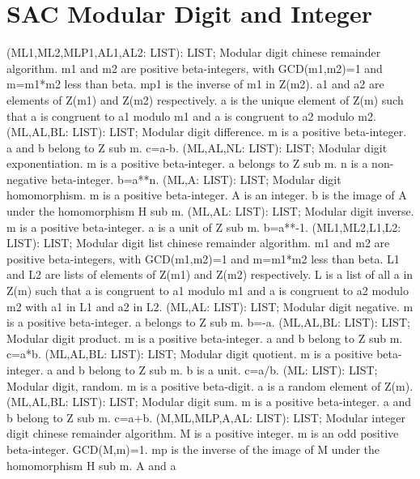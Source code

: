 \section{ SAC Modular Digit and Integer  } 
 (ML1,ML2,MLP1,AL1,AL2: LIST): LIST; \eproc
\bcom Modular digit chinese remainder algorithm. m1 and m2 are positive
beta-integers, with GCD(m1,m2)=1 and m=m1*m2 less than beta.
mp1 is the inverse of m1 in Z(m2).  a1 and a2 are elements of
Z(m1) and Z(m2) respectively.  a is the unique element of Z(m) such
that a is congruent to a1 modulo m1 and a is congruent to a2
modulo m2. \ecom 
{} (ML,AL,BL: LIST): LIST; \eproc
\bcom Modular digit difference. m is a positive beta-integer. a and b
belong to Z sub m. c=a-b. \ecom 
{} (ML,AL,NL: LIST): LIST; \eproc
\bcom Modular digit exponentiation. m is a positive beta-integer.
a belongs to Z sub m. n is a non-negative beta-integer. b=a**n. \ecom 
{} (ML,A: LIST): LIST; \eproc
\bcom Modular digit homomorphism. m is a positive beta-integer. A is an
integer. b is the image of A under the homomorphism H sub m. \ecom 
{} (ML,AL: LIST): LIST; \eproc
\bcom Modular digit inverse. m is a positive beta-integer. a is a unit
of Z sub m. b=a**-1. \ecom 
{} (ML1,ML2,L1,L2: LIST): LIST; \eproc
\bcom Modular digit list chinese remainder algorithm. m1 and m2 are
positive beta-integers, with GCD(m1,m2)=1 and m=m1*m2 less than
beta.  L1 and L2 are lists of elements of Z(m1) and Z(m2)
respectively.  L is a list of all a in Z(m) such that a is congruent
to a1 modulo m1 and a is congruent to a2 modulo m2 with a1 in L1
and a2 in L2. \ecom 
{} (ML,AL: LIST): LIST; \eproc
\bcom Modular digit negative. m is a positive beta-integer. a belongs
to Z sub m. b=-a. \ecom 
{} (ML,AL,BL: LIST): LIST; \eproc
\bcom Modular digit product. m is a positive beta-integer. a and b
belong to Z sub m. c=a*b. \ecom 
{} (ML,AL,BL: LIST): LIST; \eproc
\bcom Modular digit quotient. m is a positive beta-integer. a and b
belong to Z sub m. b is a unit. c=a/b. \ecom 
{} (ML: LIST): LIST; \eproc
\bcom Modular digit, random. m is a positive beta-digit. a is a random
element of Z(m). \ecom 
{} (ML,AL,BL: LIST): LIST; \eproc
\bcom Modular digit sum. m is a positive beta-integer. a and b belong
to Z sub m. c=a+b. \ecom 
{} (M,ML,MLP,A,AL: LIST): LIST; \eproc
\bcom Modular integer digit chinese remainder algorithm. M is a positive
integer.  m is an odd positive beta-integer.  GCD(M,m)=1.  mp is the
inverse of the image of M under the homomorphism H sub m.  A and a
